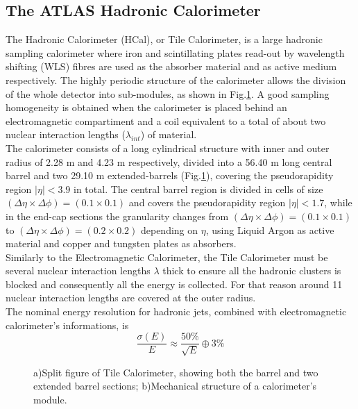 \subsection{The ATLAS Hadronic Calorimeter}
The Hadronic Calorimeter (HCal)\cite{ATLAS1996aa, Aad2010af}, or Tile Calorimeter, is a large hadronic sampling calorimeter where iron and scintillating plates read-out by wavelength shifting (WLS) fibres are used as the absorber material and as active medium respectively. The highly periodic structure of the calorimeter allows the division of the whole detector into sub-modules, as shown in Fig.\ref{TiLe_modules}. A good sampling homogeneity is obtained when the calorimeter is placed behind an electromagnetic compartiment and a coil equivalent to a total of about two nuclear interaction lengths ($\lambda_{int}$) of material.
\\
The calorimeter consists of a long cylindrical structure with inner and outer radius of 2.28 m and 4.23 m respectively, divided into a 56.40 m long central barrel and two 29.10 m extended-barrels (Fig.\ref{TiLe_modules}), covering the pseudorapidity region $|\eta| < 3.9$ in total. The central barrel region is divided in cells of size $(\Delta \eta \times \Delta \phi) = (0.1 \times 0.1)$ and covers the pseudorapidity region $|\eta| < 1.7$, while in the end-cap sections the granularity changes from $(\Delta \eta \times \Delta \phi) = (0.1 \times 0.1)$ to $(\Delta \eta \times \Delta \phi) = (0.2 \times 0.2)$ depending on $\eta$, using Liquid Argon as active material and copper and tungsten plates as absorbers.
\\
Similarly to the Electromagnetic Calorimeter, the Tile Calorimeter must be several nuclear interaction lengths $\lambda$ thick to ensure all the hadronic clusters is blocked and consequently all the energy is collected. For that reason around 11 nuclear interaction lengths are covered at the outer radius.
\\
The nominal energy resolution for hadronic jets, combined with electromagnetic calorimeter's informations, is
\begin{equation}
\frac{\sigma(E)}{E} \approx \frac{50\%}{\sqrt{E}} \oplus 3\%
\end{equation}
\begin{figure}[h]
\centering
{} \hspace{0.5cm}
\caption{a)Split figure of Tile Calorimeter, showing both the barrel and two extended barrel sections; b)Mechanical structure of a calorimeter's module.}
\label{TiLe_modules}
\end{figure}

